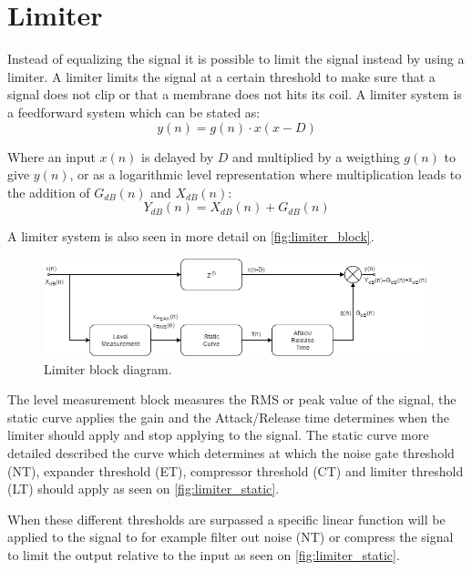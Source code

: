 \section{Limiter}
Instead of equalizing the signal it is possible to limit the signal instead by using a limiter. A limiter limits the signal at a certain threshold to make sure that a signal does not clip or that a membrane does not hits its coil. A limiter system is a feedforward system which can be stated as:
\begin{equation}
y(n) = g(n)\cdot x(x-D)
\end{equation}

Where an input $x(n)$ is delayed by $D$ and multiplied by a weigthing $g(n)$ to give $y(n)$, or as a logarithmic level representation where multiplication leads to the addition of $G_{dB}(n)$ and $X_{dB}(n)$:
\begin{equation}
Y_{dB}(n) = X_{dB}(n) + G_{dB}(n)
\end{equation}

A limiter system is also seen in more detail on \autoref{fig:limiter_block}.

\begin{figure}[H]
\centering
\includegraphics[width=1\textwidth]{figures/Limiter_block.png}
\caption{Limiter block diagram.}
\label{fig:limiter_block}
\end{figure}   


The level measurement block measures the RMS or peak value of the signal, the static curve applies the gain and the Attack/Release time determines when the limiter should apply and stop applying to the signal. The static curve more detailed described the curve which determines at which the noise gate threshold (NT), expander threshold (ET), compressor threshold (CT) and limiter threshold (LT) should apply as seen on \autoref{fig:limiter_static}. 

When these different thresholds are surpassed a specific linear function will be applied to the signal to for example filter out noise (NT) or compress the signal to limit the output relative to the input as seen on \ref{fig:limiter_static}. 

